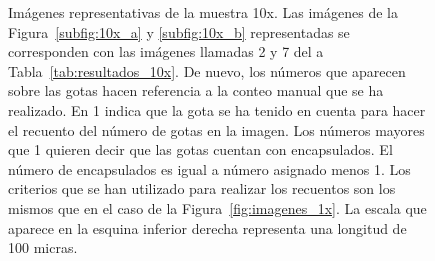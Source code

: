 
\begin{figure}[H]
  \begin{center} 
  

  \end{center}
  \vspace{-5mm}    
  \caption{\small Imágenes representativas de la muestra 10x. Las imágenes de la Figura~\ref{subfig:10x_a} y \ref{subfig:10x_b} representadas se corresponden con las imágenes llamadas 2 y 7 del a Tabla~\ref{tab:resultados_10x}. De nuevo, los números que aparecen sobre las gotas hacen referencia a la conteo manual que se ha realizado. En 1 indica que la gota se ha tenido en cuenta para hacer el recuento del número de gotas en la imagen. Los números mayores que 1 quieren decir que las gotas cuentan con encapsulados. El número de encapsulados es igual a número asignado menos 1. Los criterios que se han utilizado para realizar los recuentos son los mismos que en el caso de la Figura~\ref{fig:imagenes_1x}. La escala que aparece en la esquina inferior derecha representa una longitud de 100 micras. }
  \label{fig:imagenes_10x}
\end{figure}

